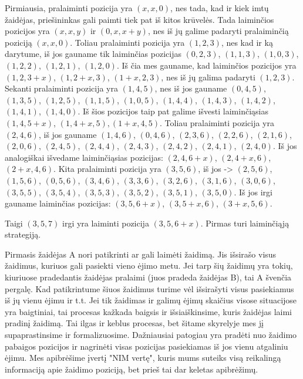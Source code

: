 \begin{sprendimas}
Pirmiausia, pralaiminti pozicija yra $(x, x, 0)$, nes tada, kad ir kiek imtų
žaidėjas, priešininkas gali paimti tiek pat iš kitos krūvelės. Tada laiminčios
pozicijos yra $(x, x, y)$ ir $(0, x, x+y)$, nes iš jų galime padaryti
pralaiminčią poziciją $(x, x, 0)$. Toliau pralaiminti pozicija yra $(1, 2, 3)$,
nes kad ir ką darytume, iš jos gauname tik laiminčias pozicijas $(0, 2,
3)$, $(1, 1, 3)$, $(1, 0, 3)$, $(1, 2, 2)$, $(1, 2, 1)$, $(1, 2, 0)$. Iš čia mes gauname,
kad laiminčios pozicijos yra $(1, 2, 3+x)$, $(1, 2+x, 3)$, $(1+x, 2, 3)$, nes iš
jų galima padaryti $(1, 2, 3)$. Sekanti pralaiminti pozicija yra $(1, 4, 5)$,
nes iš jos gauname $(0, 4, 5)$, $(1, 3, 5)$, $(1, 2, 5)$, $(1, 1, 5)$, $(1, 0,
5)$, $(1, 4, 4)$, $(1, 4, 3)$, $(1, 4, 2)$, $(1, 4, 1)$, $(1, 4, 0)$. Iš šios
pozicijos taip pat galime išvesti laiminčiąsias $(1, 4, 5+x)$, $(1, 4+x, 5),
(1+x, 4, 5)$. Toliau pralaiminti pozicija yra $(2, 4, 6)$, iš jos gauname $(1,
4, 6)$, $(0, 4, 6)$, $(2, 3, 6)$, $(2, 2, 6)$, $(2, 1, 6)$, $(2, 0, 6)$, $(2,
4, 5)$, $(2, 4, 4)$, $(2, 4, 3)$, $(2, 4, 2)$, $(2, 4, 1)$, $(2, 4, 0)$.  Iš jos
analogiškai išvedame laiminčiąsias pozicijas: $(2, 4, 6+x)$, $(2, 4+x, 6)$,
$(2+x, 4, 6)$. Kita pralaiminti pozicija yra $(3, 5, 6)$, iš jos -> $(2, 5,
6)$, $(1, 5, 6)$, $(0, 5, 6)$, $(3, 4, 6)$, $(3, 3, 6)$, $(3, 2, 6)$, $(3, 1,
6)$, $(3, 0, 6)$, $(3, 5, 5)$, $(3, 5, 4)$, $(3, 5, 3)$, $(3, 5, 2)$, $(3,
5, 1)$, $( 3, 5, 0)$. Iš jos irgi gauname laiminčias pozicijas: $(3, 5,
6+x)$, $(3, 5+x, 6)$, $(3+x, 5, 6)$.

Taigi $(3, 5, 7)$ irgi yra laiminti pozicija $(3, 5, 6+x)$.  Pirmas turi
laiminčiąją strategiją. 
\end{sprendimas}

Pirmasis žaidėjas A nori patikrinti ar gali laimėti žaidimą. Jis išsirašo visus žaidimus, kuriuos gali pasiekti vieno ėjimo metu. Jei tarp šių žaidimų yra tokių,
kiuriuose pradedantis žaidėjas pralaimi (juos pradeda žaidėjas B), tai A švenčia pergalę. Kad patikrintume šiuos žaidimus turime vėl išsirašyti visus pasiekiamus 
iš jų vienu ėjimu ir t.t. Jei tik žaidimas ir galimų ėjimų skaičius visose situacijose yra baigtiniai, tai procesas kažkada baigsis ir išsiaiškinsime, kuris žaidėjas laimi pradinį žaidimą. 
Tai ilgas ir keblus procesas, bet šitame skyrelyje mes jį supaprastinsime ir formalizuosime. Dažniausiai patogiau yra pradėti nuo žaidimo pabaigos pozicijos ir nagrinėti visas 
pozicijas pasiekiamas iš jos vienu atgaliniu ėjimu. Mes apibrėšime įvertį "NIM vertę", kuris mums suteiks visą reikalingą informaciją apie žaidimo poziciją, bet prieš tai dar keletas apibrėžimų.

